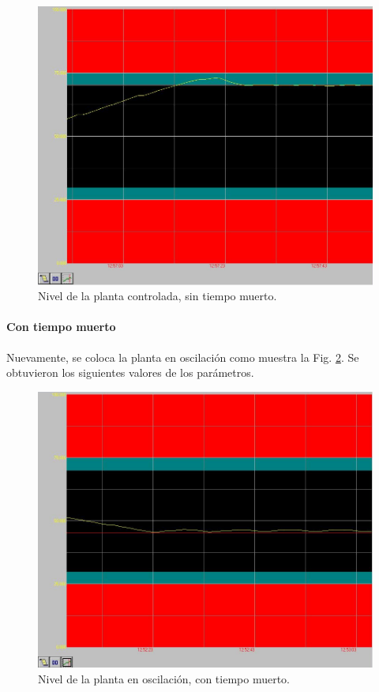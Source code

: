 \begin{figure}[ht]
 \centering
 \includegraphics[scale=0.4]{Cap4-ProgramacionPLC/images/controlado.png}
 \caption{Nivel de la planta controlada, sin tiempo muerto.}
 \label{fig:controlado}
\end{figure}


\paragraph{Con tiempo muerto}

Nuevamente, se coloca la planta en oscilación como muestra la Fig.
\ref{fig:oscilacionpermtd}.
Se obtuvieron los siguientes valores de los parámetros.

\begin{figure}[ht]
 \centering
 \includegraphics[scale=0.4]{Cap4-ProgramacionPLC/images/oscpermtd.png}
 \caption{Nivel de la planta en oscilación, con tiempo muerto.}
 \label{fig:oscilacionpermtd}
\end{figure}

